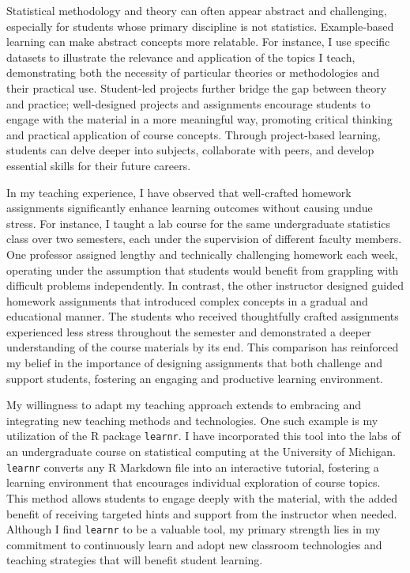 \documentclass{article}
\begin{document}
Statistical methodology and theory can often appear abstract and challenging, especially for students whose primary discipline is not statistics.
Example-based learning can make abstract concepts more relatable.
For instance, I use specific datasets to illustrate the relevance and application of the topics I teach, demonstrating both the necessity of particular theories or methodologies and their practical use.
Student-led projects further bridge the gap between theory and practice; well-designed projects and assignments encourage students to engage with the material in a more meaningful way, promoting critical thinking and practical application of course concepts.
Through project-based learning, students can delve deeper into subjects, collaborate with peers, and develop essential skills for their future careers.

In my teaching experience, I have observed that well-crafted homework assignments significantly enhance learning outcomes without causing undue stress.
For instance, I taught a lab course for the same undergraduate statistics class over two semesters, each under the supervision of different faculty members.
One professor assigned lengthy and technically challenging homework each week, operating under the assumption that students would benefit from grappling with difficult problems independently.
In contrast, the other instructor designed guided homework assignments that introduced complex concepts in a gradual and educational manner.
The students who received thoughtfully crafted assignments experienced less stress throughout the semester and demonstrated a deeper understanding of the course materials by its end.
This comparison has reinforced my belief in the importance of designing assignments that both challenge and support students, fostering an engaging and productive learning environment.

My willingness to adapt my teaching approach extends to embracing and integrating new teaching methods and technologies.
One such example is my utilization of the R package \texttt{learnr}.
I have incorporated this tool into the labs of an undergraduate course on statistical computing at the University of Michigan.
\texttt{learnr} converts any R Markdown file into an interactive tutorial, fostering a learning environment that encourages individual exploration of course topics.
This method allows students to engage deeply with the material, with the added benefit of receiving targeted hints and support from the instructor when needed.
Although I find \texttt{learnr} to be a valuable tool, my primary strength lies in my commitment to continuously learn and adopt new classroom technologies and teaching strategies that will benefit student learning.
\end{document}
